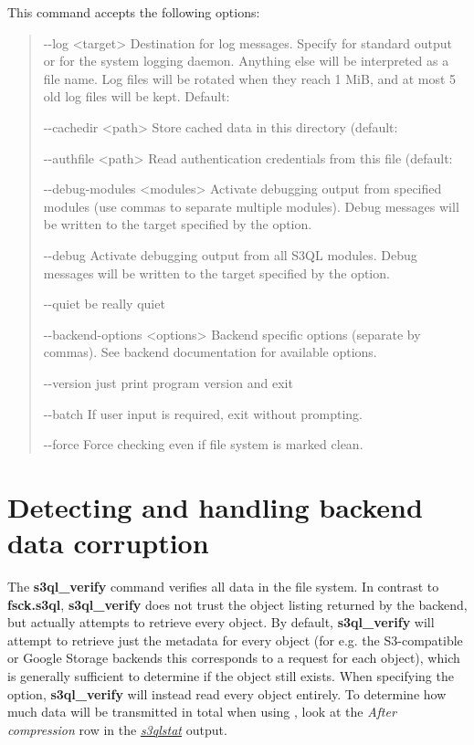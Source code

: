 \documentclass[letterpaper,10pt,english]{sphinxmanual}
\begin{document}
This command accepts the following options:
\begin{quote}
\begin{optionlist}{3cm}
\item [-{-}log \textless{}target\textgreater{}]  
Destination for log messages. Specify  for
standard output or  for the system logging
daemon. Anything else will be interpreted as a file
name. Log files will be rotated when they reach 1 MiB,
and at most 5 old log files will be kept. Default:
\item [-{-}cachedir \textless{}path\textgreater{}]  
Store cached data in this directory (default:
\item [-{-}authfile \textless{}path\textgreater{}]  
Read authentication credentials from this file
(default: 
\item [-{-}debug-modules \textless{}modules\textgreater{}]  
Activate debugging output from specified modules (use
commas to separate multiple modules). Debug messages
will be written to the target specified by the
 option.
\item [-{-}debug]  
Activate debugging output from all S3QL modules. Debug
messages will be written to the target specified by
the  option.
\item [-{-}quiet]  
be really quiet
\item [-{-}backend-options \textless{}options\textgreater{}]  
Backend specific options (separate by commas). See
backend documentation for available options.
\item [-{-}version]  
just print program version and exit
\item [-{-}batch]  
If user input is required, exit without prompting.
\item [-{-}force]  
Force checking even if file system is marked clean.
\end{optionlist}
\end{quote}


\section{Detecting and handling backend data corruption}
\label{fsck:detecting-and-handling-backend-data-corruption}\label{fsck:s3ql-verify}
The \textbf{s3ql\_verify} command verifies all data in the file
system.  In contrast to \textbf{fsck.s3ql}, \textbf{s3ql\_verify}
does not trust the object listing returned by the backend, but
actually attempts to retrieve every object. By default,
\textbf{s3ql\_verify} will attempt to retrieve just the metadata for
every object (for e.g. the S3-compatible or Google Storage backends
this corresponds to a  request for each object), which is
generally sufficient to determine if the object still exists. When
specifying the  option, \textbf{s3ql\_verify} will
instead read every object entirely. To determine how much data will be
transmitted in total when using , look at the \emph{After
compression} row in the {\hyperref[special:s3qlstat]{\emph{s3qlstat}}} output.
\end{document}
